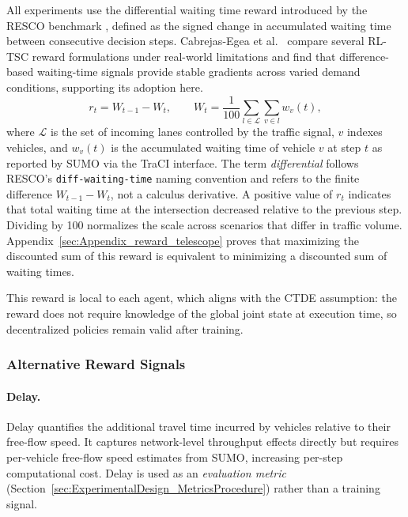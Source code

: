 All experiments use the differential waiting time reward introduced by the RESCO benchmark \citep{ault2021reinforcement}, defined as the signed change in accumulated waiting time between consecutive decision steps. Cabrejas-Egea et al.\ \citep{cabrejas2020assessment} compare several RL-TSC reward formulations under real-world limitations and find that difference-based waiting-time signals provide stable gradients across varied demand conditions, supporting its adoption here.
\begin{equation}
  r_t = W_{t-1} - W_t,
  \qquad
  W_t = \frac{1}{100}\sum_{l \in \mathcal{L}}\sum_{v \in l} w_v(t),
  \label{eq:reward}
\end{equation}
where $\mathcal{L}$ is the set of incoming lanes controlled by the traffic signal, $v$ indexes vehicles, and $w_v(t)$ is the accumulated waiting time of vehicle $v$ at step $t$ as reported by SUMO via the TraCI interface. The term \emph{differential} follows RESCO's \texttt{diff-waiting-time} naming convention and refers to the finite difference $W_{t-1} - W_t$, not a calculus derivative. A positive value of $r_t$ indicates that total waiting time at the intersection decreased relative to the previous step. Dividing by 100 normalizes the scale across scenarios that differ in traffic volume. Appendix~\ref{sec:Appendix_reward_telescope} proves that maximizing the discounted sum of this reward is equivalent to minimizing a discounted sum of waiting times.

This reward is local to each agent, which aligns with the CTDE assumption: the reward does not require knowledge of the global joint state at execution time, so decentralized policies remain valid after training.

\subsubsection{Alternative Reward Signals}
\label{sec:Methodology_AltRewards}

\paragraph{Delay.}
Delay quantifies the additional travel time incurred by vehicles relative to their free-flow speed. It captures network-level throughput effects directly but requires per-vehicle free-flow speed estimates from SUMO, increasing per-step computational cost. Delay is used as an \emph{evaluation metric} (Section~\ref{sec:ExperimentalDesign_MetricsProcedure}) rather than a training signal.


